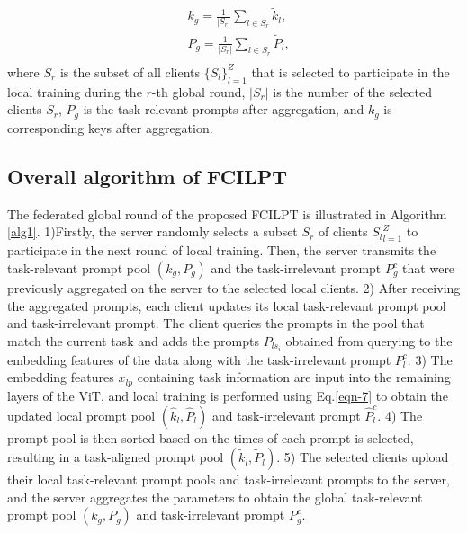\documentclass[sigconf,anonymous,review,screen]{acmart}
\begin{document}
\begin{equation}\label{eqn-11}
	\begin{aligned}
		&k_g = \frac{1}{\left| S_r \right|} \sum_{l \in S_r} \tilde{k}_l, \\
		&P_g = \frac{1}{\left| S_r \right|} \sum_{l \in S_r} \tilde{P}_l, \\
	\end{aligned}
\end{equation}
where $S_r$ is the subset of all clients $\{S_l\}_{l=1}^Z$ that is selected to participate in the local training during the $r$-th global round, $\left| S_r \right|$ is the number of the selected clients $S_r$, $P_g$ is the task-relevant prompts after aggregation, and $k_g$ is corresponding keys after aggregation. 

\subsection{Overall algorithm of FCILPT}\label{Overall algorithm of FCILPT}

The federated global round of the proposed FCILPT is illustrated in Algorithm \ref{alg1}. 
1)Firstly, the server randomly selects a subset $S_r$ of clients ${S_l}_{l=1}^Z$ to participate in the next round of local training. Then, the server transmits the task-relevant prompt pool $(k_g, P_g)$ and the task-irrelevant prompt $P_g^c$ that were previously aggregated on the server to the selected local clients.
2) After receiving the aggregated prompts, each client updates its local task-relevant prompt pool and task-irrelevant prompt. The client queries the prompts in the pool that match the current task and adds the prompts $P_{ls_i}$ obtained from querying to the embedding features of the data along with the task-irrelevant prompt $P_l^c$. 
3) The embedding features $x_{lp}$ containing task information are input into the remaining layers of the ViT, and local training is performed using Eq.\eqref{eqn-7} to obtain the updated local prompt pool $(\hat{k}_l, \hat{P}_l)$ and task-irrelevant prompt $\hat{P}_l^c$.
4) The prompt pool is then sorted based on the times of each prompt is selected, resulting in a task-aligned prompt pool $(\tilde{k}_l, \tilde{P}_l)$. 
5) The selected clients upload their local task-relevant prompt pools and task-irrelevant prompts to the server, and the server aggregates the parameters to obtain the global task-relevant prompt pool $(k_g, P_g)$ and task-irrelevant prompt $P_g^c$.
\end{document}
